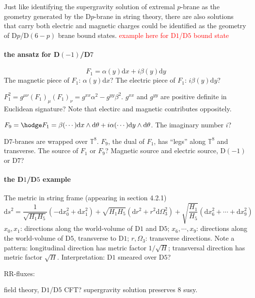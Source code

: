 
Just like identifying the supergravity solution of extremal $p$-brane as the geometry generated by the D$p$-brane in string theory, there are also solutions that carry both electric and magnetic charges could be identified as the geometry of D$p$/D$(6-p)$ brane bound states.
\textcolor{red}{example here for D$1$/D$5$ bound state}

\paragraph{the ansatz for D$(-1)$/D$7$}
\begin{equation*}
    F_1 = \alpha (y) \mathrm{d} x
    + i \beta(y) \mathrm{d} y
\end{equation*}
The magnetic piece of $F_1$: $\alpha(y)\mathrm{d}x$?
The electric piece of $F_1$: $i \beta(y) \mathrm{d}y$?

$F_1^2 = g^{\mu\nu} (F_1)_\mu (F_1)_\nu = g^{x x} \alpha^2 - g^{ y y} \beta^2$.
$g^{xx}$ and $g^{yy}$ are positive definite in Euclidean signature?
Note that electirc and magnetic contributes oppositely.

$F_9 = \hodge F_1 = \beta (\cdots) \mathrm{d}x \wedge \mathrm{d}\theta
+ i \alpha (\cdots) \mathrm{d}y \wedge \mathrm{d}\theta$.
The imaginary number $i$?

D$7$-branes are wrapped over $\mathbb{T}^8$.
$F_9$, the dual of $F_1$, has ``legs'' along $\mathbb{T}^8$ and transverse.
The source of $F_1$ or $F_9$? Magnetic source and electric source,
D$(-1)$ or D$7$?

\paragraph{the D$1$/D$5$ example}
The metric in string frame (appearing in  section 4.2.1)
\begin{equation}
	\mathrm{d}s^2 = \frac{1}{\sqrt{H_1 H_5}} (-\mathrm{d}x_0^2 + \mathrm{d}x_1^2)
	+ \sqrt{H_1 H_5}(\mathrm{d}r^2 + r^2 \mathrm{d}\Omega_3^2)
	+\sqrt{\frac{H_1}{H_5}} (\mathrm{d}x_6^2 + \cdots + \mathrm{d}x_9^2)
\end{equation}
$x_0,x_1$: directions along the world-volume of D$1$ and D$5$;
$x_6,\cdots,x_9$: directions along the world-volume of D$5$, transverse to D$1$;
$r,\Omega_3$: transverse directions.
Note a pattern: longitudinal direction has metric factor $1/\sqrt{H}$;
transversal direction has metric factor $\sqrt{H}$.
Interpretation: D$1$ smeared over D$5$?

RR-fluxes:

field theory, D$1$/D$5$ CFT?
supergravity solution preserves $8$ susy.
